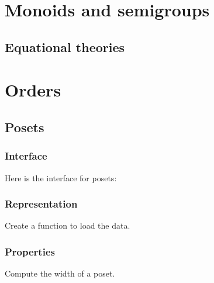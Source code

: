 \chapter{Monoids and semigroups}


\section{Equational theories}



\chapter{Orders}


\section{Posets}


\begin{figure}

  \caption{}
  \label{fig:poset-finiteposet}
\end{figure}


\subsection*{Interface}

Here is the interface for posets:

%

\subsection*{Representation}


\begin{gradedexercise}[Representation]
  Create a function to load the data.


%

\end{gradedexercise}

\subsection{Properties}


\begin{gradedexercise}
  Compute the width of a poset.
\end{gradedexercise}

